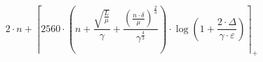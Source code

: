 \[2 \cdot n + \left\lceil 2560 \cdot \left(n + \frac{\sqrt{\frac{L}{\mu}}}{\gamma} + \frac{\left(\frac{n \cdot \delta}{\mu}\right)^{\frac{2}{3}}}{\gamma^{\frac{4}{3}}}\right) \cdot \log\left(1 + \frac{2 \cdot \Delta}{\gamma \cdot \varepsilon}\right) \right\rceil_{+}\]
